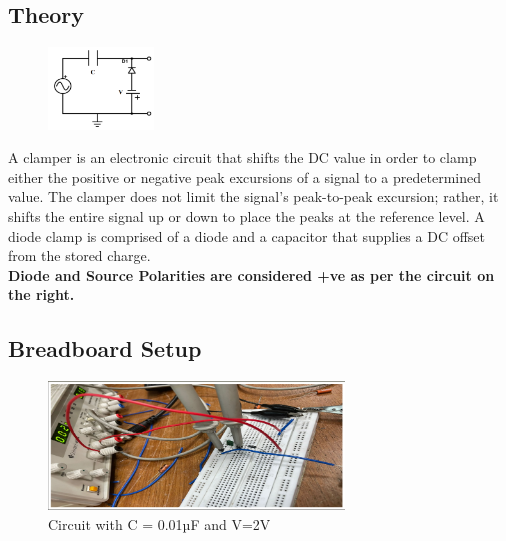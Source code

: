\documentclass{article}
\begin{document}
\subsection{Theory}
\begin{figure}
    {\includegraphics[width=0.25\textwidth]{pic13.png}}
\end{figure}
A clamper is an electronic circuit that shifts the DC value in order to clamp either the positive or negative peak excursions of a signal to a predetermined value. The clamper does not limit the signal's peak-to-peak excursion; rather, it shifts the entire signal up or down to place the peaks at the reference level. A diode clamp is comprised of a diode and a capacitor that supplies a DC offset from the stored charge.\\
\textbf{Diode and Source Polarities are considered +ve as per the circuit on the right.}
\subsection{Breadboard Setup}
\begin{figure}[h!]
    \centering
    \includegraphics[width=0.7\textwidth]{pic14.png}
    \caption{Circuit with C = 0.01µF and V=2V}
\end{figure}
\end{document}
